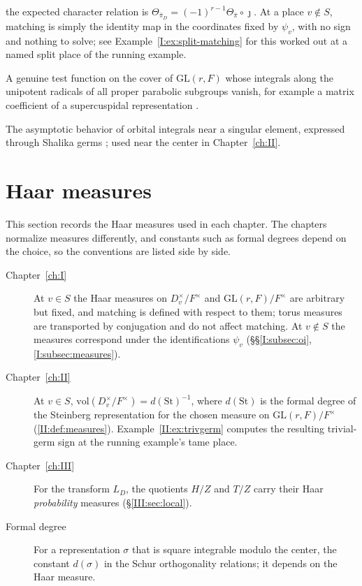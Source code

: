 \begin{description}
the expected character relation is
$\Theta_{\overline\pi_D}=(-1)^{r-1}\Theta_{\overline\pi}\circ\jmath$.
At a place $v\notin S$, matching is simply the identity map in the
coordinates fixed by $\psi_v$, with no sign and nothing to solve; see
Example~\ref{I:ex:split-matching} for this worked out at a named
split place of the running example.
\item[Supercusp form] A genuine test function on the cover of
$\mathrm{GL}(r,F)$ whose integrals along the unipotent radicals of
all proper parabolic subgroups vanish, for example a matrix
coefficient of a supercuspidal representation \cite[\S13]{FK86}.
\item[Germ] The asymptotic behavior of orbital integrals near a
singular element, expressed through Shalika germs \cite[\S8]{FK86}; used near the center in Chapter~\ref{ch:II}.
\end{description}

\section{Haar measures}\label{gl:measures}
This section records the Haar measures used in each chapter. The chapters normalize measures differently, and constants such as formal degrees depend on the choice, so the conventions are listed side by side.

\begin{description}
\item[Chapter~\ref{ch:I}] At $v\in S$ the Haar measures on $D_v^\times/F^\times$
and $\mathrm{GL}(r,F)/F^\times$ are arbitrary but fixed, and matching
is defined with respect to them; torus measures are transported by
conjugation and do not affect matching.  At $v\notin S$ the measures
correspond under the identifications $\psi_v$ (\S\S\ref{I:subsec:oi}, \ref{I:subsec:measures}).
\item[Chapter~\ref{ch:II}] At $v\in S$,
$\mathrm{vol}(D_v^\times/F^\times)=d(\mathrm{St})^{-1}$, where
$d(\mathrm{St})$ is the formal degree of the Steinberg representation
for the chosen measure on $\mathrm{GL}(r,F)/F^\times$ (\cref{II:def:measures}).  Example~\ref{II:ex:trivgerm} computes the resulting
trivial-germ sign at the running example's tame place.
\item[Chapter~\ref{ch:III}] For the transform $L_D$, the quotients $H/Z$ and
$T/Z$ carry their Haar \emph{probability} measures (\S\ref{III:sec:local}).
\item[Formal degree] For a representation $\sigma$ that is square
integrable modulo the center, the constant $d(\sigma)$ in the Schur
orthogonality relations; it depends on the Haar measure.
\end{description}

